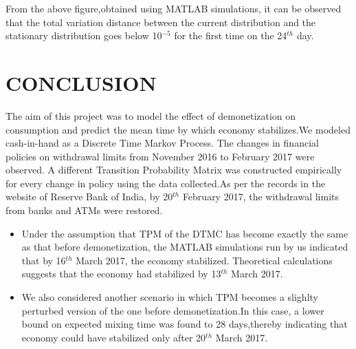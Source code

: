 \documentclass[12pt]{article}
\begin{document}
From the above figure,obtained using MATLAB simulations, it can be observed that the total variation distance between the current distribution and the stationary distribution goes below 10$^{-5}$ for the first time on the 24$^{th}$ day.

\section{CONCLUSION}
The aim of this project was to model the effect of demonetization on consumption and predict the mean time by which economy stabilizes.We modeled cash-in-hand as a Discrete Time Markov Process. The changes in financial policies on withdrawal limits from November 2016 to February 2017 were observed. A different Transition Probability Matrix was constructed empirically for every change in policy using the data collected.As per the records in the website of Reserve Bank of India, by 20$^{th}$ February 2017, the withdrawal limits from banks and ATMs were restored.
\begin{itemize}
\item Under the assumption that TPM of the DTMC has become exactly the same as that before demonetization, the MATLAB simulations run by us indicated that by  16$^{th}$ March 2017, the economy  stabilized. Theoretical calculations suggests that the economy had stabilized by 13$^{th}$ March 2017.
\item We also considered another scenario in which TPM becomes a slighlty perturbed version of the one before demonetization.In this case, a lower bound on expected mixing time was found to 28 days,thereby indicating that economy could have stabilized only after 20$^{th}$ March 2017.
\end{itemize} 
\newpage
\end{document}
